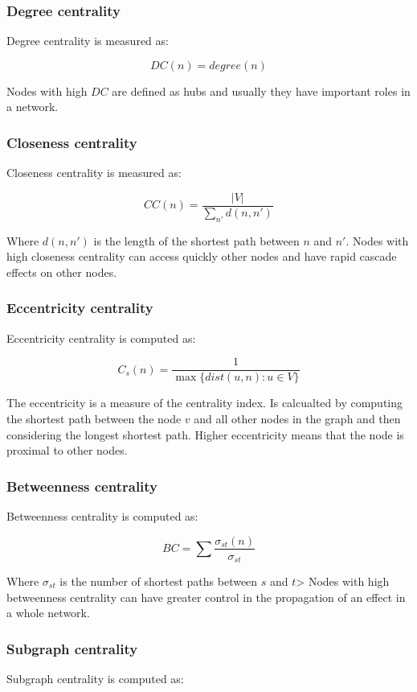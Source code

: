 		\subsubsection{Degree centrality}
		Degree centrality is measured as:

		$$DC(n) = degree(n)$$

		Nodes with high $DC$ are defined as hubs and usually they have important roles in a network.

		\subsubsection{Closeness centrality}
		Closeness centrality is measured as:

		$$CC(n) = \frac{|V|}{\sum\limits_{n'}d(n,n')}$$

		Where $d(n,n')$ is the length of the shortest path between $n$ and $n'$.
		Nodes with high closeness centrality can access quickly other nodes and have rapid cascade effects on other nodes.

		\subsubsection{Eccentricity centrality}
		Eccentricity centrality is computed as:

		$$C_s(n) = \frac{1}{\max\{dist(u,n):u\in V\}}$$

		The eccentricity is a measure of the centrality index.
		Is calcualted by computing the shortest path between the node $v$ and all other nodes in the graph and then considering the longest shortest path.
		Higher eccentricity means that the node is proximal to other nodes.

		\subsubsection{Betweenness centrality}
		Betweenness centrality is computed as:

		$$BC = \sum\frac{\sigma_{st}(n)}{\sigma_{st}}$$

		Where $\sigma_{st}$ is the number of shortest paths between $s$ and $t$>
		Nodes with high betweenness centrality can have greater control in the propagation of an effect in a whole network.

		\subsubsection{Subgraph centrality}
		Subgraph centrality is computed as:

